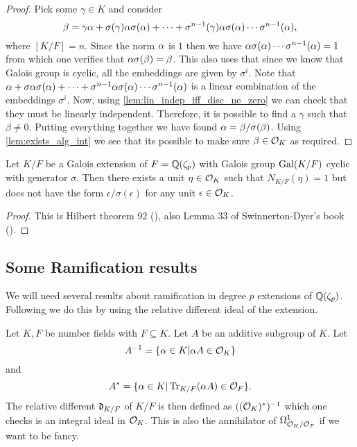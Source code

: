 \begin{proof}
  Pick some $\gamma \in K$ and consider \[\beta=\gamma \alpha+ \sigma(\gamma)\alpha \sigma(\alpha)+\cdots+\sigma^{n-1}(\gamma)\alpha \sigma(\alpha)\cdots \sigma^{n-1}(\alpha),\] where $[K/F]=n$. Since the norm $\alpha$ is $1$ then we have $\alpha \sigma(\alpha)\cdots \sigma^{n-1}(\alpha)=1$ from which one verifies that $\alpha \sigma(\beta)=\beta$. This also uses that since we know that Galois group is cyclic, all the embeddings are given by $\sigma^i$. Note that $ \alpha+ \sigma\alpha \sigma(\alpha)+\cdots+\sigma^{n-1}\alpha \sigma(\alpha)\cdots \sigma^{n-1}(\alpha)$ is a linear combination of the embeddings $\sigma^i$. Now, using \ref{lem:lin_indep_iff_disc_ne_zero} we can check that they must be linearly independent. Therefore, it is possible to find a $\gamma$ such that $\beta \neq 0$. Putting everything together we have found $\alpha=\beta/\sigma(\beta)$. Using \ref{lem:exists_alg_int} we see that its possible to make sure $\beta \in \mathcal{O}_K$ as required.




\end{proof}


\begin{theorem}[Hilbert 92]\label{lem:Hilbert92}
	Let $K/F$ be a Galois extension of $F=\mathbb{Q}(\zeta_p)$ with  Galois group $\operatorname{Gal}(K/F)$ cyclic with generator $\sigma$. Then there exists a unit $\eta \in \mathcal{O}_K$ such that $N_{K/F}(\eta)=1$ but does not have the form $\epsilon/\sigma(\epsilon)$ for any unit $\epsilon \in \mathcal{O}_K$.

\end{theorem}

\begin{proof}
This is Hilbert theorem 92 (\cite{Hilbert}), also Lemma 33 of Swinnerton-Dyer's book (\cite{SD}).



\end{proof}


\subsection{Some Ramification results}

We will need several results about ramification in degree $p$ extensions of $\mathbb{Q}(\zeta_p)$. Following \cite{SD} we do this by using the relative different ideal of the extension.

\begin{definition}\label{def:rel_different}

    Let $K, F$ be number fields with $F \subseteq K$. Let  $A$ be an additive subgroup of $K$. Let \[A^{-1}=\{ \alpha \in K | \alpha A \in \mathcal{O}_K\}\] and
    \[A^* = \{ \alpha \in K | \operatorname{Tr}_{K/F} (\alpha A) \in \mathcal{O}_F\}.\] The relative different $\frak{d}_{K/F}$ of $K/F$ is then defined as $((\mathcal{O}_K)^*)^{-1}$ which one checks is an integral ideal in $\mathcal{O}_K$. This is also the annihilator of $\Omega^1_{\mathcal{O}_K/\mathcal{O}_F}$ if we want to be fancy.
\end{definition}


